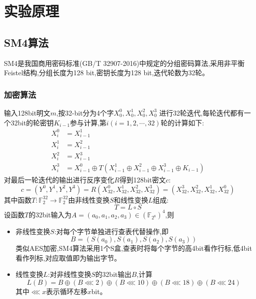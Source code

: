 \section{实验原理}
\subsection{SM4算法}
SM4是我国商用密码标准(GB/T 32907-2016)中规定的分组密码算法,采用非平衡Feistel结构,分组长度为128 bit,密钥长度为128 bit,迭代轮数为32轮。
\subsubsection{加密算法}
输入128bit明文\(m\),按32-bit分为4个字\(X^0_0,X^1_0,X^2_0,X^3_0\)
进行32轮迭代,每轮迭代都有一个32bit的轮密钥$K_{i-1}$参与计算,第$i(i = 1,2,\cdots,32)$轮的计算如下:
\[
\begin{aligned}
    X^0_{i} &= X^1_{i-1} \\
    X^1_{i} &= X^2_{i-1} \\
    X^2_{i} &= X^3_{i-1} \\
    X^3_{i} &= X^0_{i-1} \oplus T(X^1_{i-1}\oplus X^2_{i-1}\oplus X^3_{i-1}\oplus K_{i-1})
\end{aligned}
\]
对最后一轮迭代的输出进行反序变化$R$得到128bit密文\(c\):
\[
c = (Y^0,Y^1,Y^2,Y^3) = R(X^{0}_{32},X_{32}^1,X_{32}^2,X_{32}^3) = (X^3_{32},X^2_{32},X^1_{32},X^0_{32})
\]
其中函数$T:\mathbb{F}_2^{32}\to \mathbb{F}_2^{32}$由非线性变换\(S\)和线性变换\(L\)组成:
\[    T = L\circ  S   \]
设函数$T$的32bit输入为$A = (a_0,a_1,a_2,a_3) \in (\mathbb{F}_{2^8})^4$,则
\begin{itemize}
    \item 非线性变换$S$:对每个字节单独进行查表代替操作,即
    \[ B = (S(a_0),S(a_1),S(a_2),S(a_3))  \]
类似AES加密,SM4算法采用1个S盒,查表时将每个字节的高4bit看作行标,低4bit看作列标,对应取值即为输出字节。
    \item 线性变换$L$:对非线性变换$S$的32bit输出$B$,计算
    \[   L(B) = B \oplus (B \lll 2) \oplus (B \lll 10) \oplus (B \lll 18) \oplus (B \lll 24) \]
    其中$\lll x$表示循环左移$x$bit。
\end{itemize}
